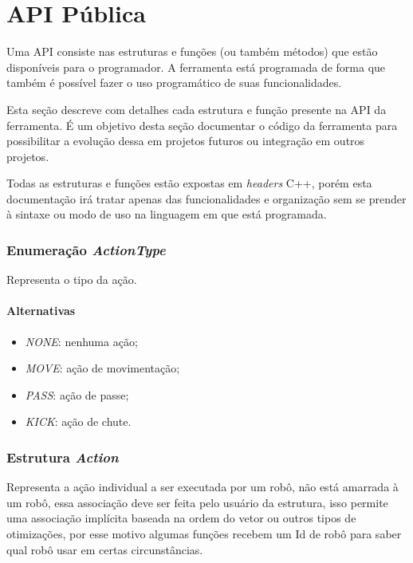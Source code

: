 \chapter{API Pública}\label{cap:api}


Uma API consiste nas estruturas e funções (ou também métodos) que estão
disponíveis para o programador.  A ferramenta está programada de forma que
também é possível fazer o uso programático de suas funcionalidades.

Esta seção descreve com detalhes cada estrutura e função presente na API da
ferramenta.  É um objetivo desta seção documentar o código da ferramenta para
possibilitar a evolução dessa em projetos futuros ou integração em outros
projetos.

Todas as estruturas e funções estão expostas em \textit{headers} C++, porém esta
documentação irá tratar apenas das funcionalidades e organização sem  se prender
à sintaxe ou modo de uso na linguagem em que está programada.

\subsection*{Enumeração \textit{ActionType}}

Representa o tipo da ação.

\subsubsection*{Alternativas}

\begin{itemize}
  \item \textit{NONE}: nenhuma ação;
  \item \textit{MOVE}: ação de movimentação;
  \item \textit{PASS}: ação de passe;
  \item \textit{KICK}: ação de chute.
\end{itemize}

\subsection*{Estrutura \textit{Action}}

Representa a ação individual a ser executada por um robô, não está amarrada à um
robô, essa associação deve ser feita pelo usuário da estrutura, isso permite uma
associação implícita baseada na ordem do vetor ou outros tipos de otimizações,
por esse motivo algumas funções recebem um Id de robô para saber qual robô usar
em certas circunstâncias.

